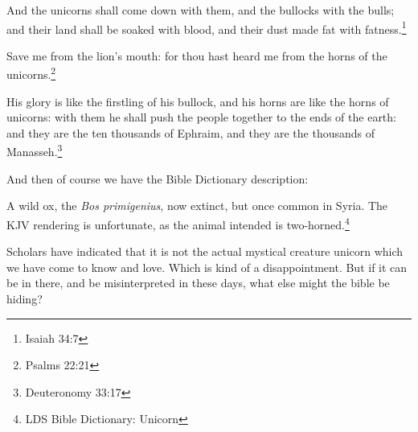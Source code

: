 \begin{displayquote}
And the unicorns shall come down with them, and the bullocks with the bulls; and 
their land shall be soaked with blood, and their dust made fat with 
fatness.\footnote{Isaiah 34:7} 
\end{displayquote}

\begin{displayquote}
Save me from the lion's mouth: for thou hast heard me from the 
horns of the unicorns.\footnote{Psalms 22:21}
\end{displayquote}

\begin{displayquote}
His glory is like the firstling of his bullock, and his horns are like the horns 
of unicorns: with them he shall push the people together to the ends of the 
earth: and they are the ten thousands of Ephraim, and they are the thousands 
of Manasseh.\footnote{Deuteronomy 33:17} 
\end{displayquote}

And then of course we have the Bible Dictionary description:

\begin{displayquote}
A wild ox, the \textit{Bos primigenius}, now extinct, but once common in Syria. 
The KJV rendering is unfortunate, as the animal intended is two-horned.\footnote{
LDS Bible Dictionary: Unicorn
}
\end{displayquote}

Scholars have indicated that it is not the actual mystical creature unicorn which we
have come to know and love. Which is kind of a disappointment. But if it can be in
there, and be misinterpreted in these days, what else might the bible be hiding?